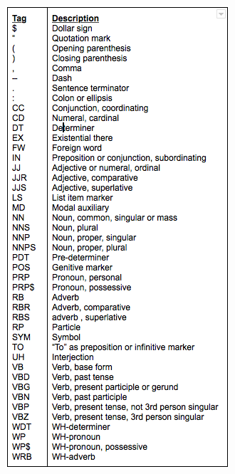 \documentclass[11pt,a4paper]{article}
\newenvironment{Figure}
  {\par\medskip\noindent\minipage{\linewidth}}
  {\endminipage\par\medskip}
\begin{document}
\begin{multicols}{2}
\begin{Figure}  
   \centering
   \includegraphics[width=\linewidth]{POStags}
\end{Figure} 


\end{multicols}
\end{document}
